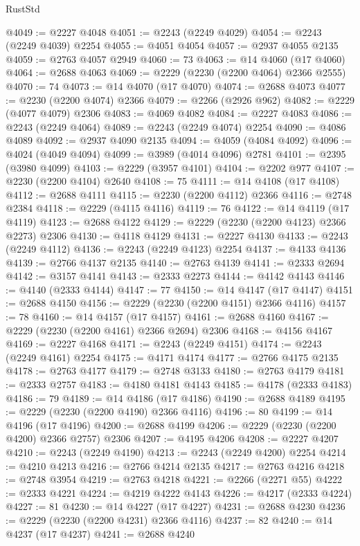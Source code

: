\begin{lexlean}{RustStd}
\begin{coremodule}
@4049 := @2227 @4048
@4051 := @2243 (@2249 @4029)
@4054 := @2243 (@2249 @4039) @2254
@4055 := @4051 @4054
@4057 := @2937 @4055 @2135
@4059 := @2763 @4057 @2949
@4060 := 73
@4063 := @14 @4060 (@17 @4060)
@4064 := @2688 @4063
@4069 := @2229 (@2230 (@2200 @4064) @2366 @2555)
@4070 := 74
@4073 := @14 @4070 (@17 @4070)
@4074 := @2688 @4073
@4077 := @2230 (@2200 @4074) @2366
@4079 := @2266 (@2926 @962)
@4082 := @2229 (@4077 @4079) @2306
@4083 := @4069 @4082
@4084 := @2227 @4083
@4086 := @2243 (@2249 @4064)
@4089 := @2243 (@2249 @4074) @2254
@4090 := @4086 @4089
@4092 := @2937 @4090 @2135
@4094 := @4059 (@4084 @4092)
@4096 := @4024 (@4049 @4094)
@4099 := @3989 (@4014 @4096) @2781
@4101 := @2395 (@3980 @4099)
@4103 := @2229 (@3957 @4101)
@4104 := @2202 @977
@4107 := @2230 (@2200 @4104) @2640
@4108 := 75
@4111 := @14 @4108 (@17 @4108)
@4112 := @2688 @4111
@4115 := @2230 (@2200 @4112) @2366
@4116 := @2748 @2384
@4118 := @2229 (@4115 @4116)
@4119 := 76
@4122 := @14 @4119 (@17 @4119)
@4123 := @2688 @4122
@4129 := @2229 (@2230 (@2200 @4123) @2366 @2273) @2306
@4130 := @4118 @4129
@4131 := @2227 @4130
@4133 := @2243 (@2249 @4112)
@4136 := @2243 (@2249 @4123) @2254
@4137 := @4133 @4136
@4139 := @2766 @4137 @2135
@4140 := @2763 @4139
@4141 := @2333 @2694
@4142 := @3157 @4141
@4143 := @2333 @2273
@4144 := @4142 @4143
@4146 := @4140 (@2333 @4144)
@4147 := 77
@4150 := @14 @4147 (@17 @4147)
@4151 := @2688 @4150
@4156 := @2229 (@2230 (@2200 @4151) @2366 @4116)
@4157 := 78
@4160 := @14 @4157 (@17 @4157)
@4161 := @2688 @4160
@4167 := @2229 (@2230 (@2200 @4161) @2366 @2694) @2306
@4168 := @4156 @4167
@4169 := @2227 @4168
@4171 := @2243 (@2249 @4151)
@4174 := @2243 (@2249 @4161) @2254
@4175 := @4171 @4174
@4177 := @2766 @4175 @2135
@4178 := @2763 @4177
@4179 := @2748 @3133
@4180 := @2763 @4179
@4181 := @2333 @2757
@4183 := @4180 @4181 @4143
@4185 := @4178 (@2333 @4183)
@4186 := 79
@4189 := @14 @4186 (@17 @4186)
@4190 := @2688 @4189
@4195 := @2229 (@2230 (@2200 @4190) @2366 @4116)
@4196 := 80
@4199 := @14 @4196 (@17 @4196)
@4200 := @2688 @4199
@4206 := @2229 (@2230 (@2200 @4200) @2366 @2757) @2306
@4207 := @4195 @4206
@4208 := @2227 @4207
@4210 := @2243 (@2249 @4190)
@4213 := @2243 (@2249 @4200) @2254
@4214 := @4210 @4213
@4216 := @2766 @4214 @2135
@4217 := @2763 @4216
@4218 := @2748 @3954
@4219 := @2763 @4218
@4221 := @2266 (@2271 @55)
@4222 := @2333 @4221
@4224 := @4219 @4222 @4143
@4226 := @4217 (@2333 @4224)
@4227 := 81
@4230 := @14 @4227 (@17 @4227)
@4231 := @2688 @4230
@4236 := @2229 (@2230 (@2200 @4231) @2366 @4116)
@4237 := 82
@4240 := @14 @4237 (@17 @4237)
@4241 := @2688 @4240

\end{coremodule}
\end{lexlean}
